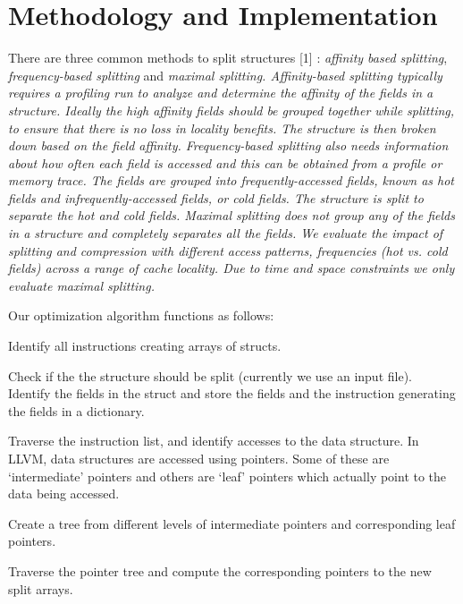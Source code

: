 \section{Methodology and Implementation}
\label{sec:meth}

There are three common methods to split structures [1] : { \em affinity based
splitting},  { \em frequency-based splitting} and \em {maximal splitting}. {\em
Affinity-based splitting} typically requires a profiling run to analyze and
determine the affinity of the fields in a structure. Ideally the high affinity
fields should be grouped together while splitting, to ensure that there is no
loss in locality benefits. The structure is then broken down based on the field
affinity. {\em Frequency-based splitting} also needs information about how often
each field is accessed and this can be obtained from a profile or memory trace.
The fields are grouped into frequently-accessed fields, known as hot fields and
infrequently-accessed fields, or cold fields. The structure is split to separate
the {\em hot} and {\em cold fields}. {\em Maximal splitting} does not group any
of the fields in a structure and completely separates all the fields. We
evaluate the impact of splitting and compression with different access patterns,
frequencies (hot vs. cold fields) across a range of cache locality. Due to time
and space constraints we only evaluate maximal splitting. 

Our optimization algorithm functions as follows:

\squishlist

\item Identify all instructions creating arrays of structs.

\item Check if the the structure should be split (currently we use an input file).
Identify the fields in the struct and store the fields and the instruction
generating the fields in a dictionary.

\item Traverse the instruction list, and identify accesses to the data structure. In
LLVM, data structures are accessed using pointers. Some of these are
‘intermediate’ pointers and others are ‘leaf’  pointers which actually point to
the data being accessed.

\item Create a tree from different levels of intermediate pointers and corresponding
leaf pointers.

\item Traverse the pointer tree and compute the corresponding pointers to the new
split arrays.

